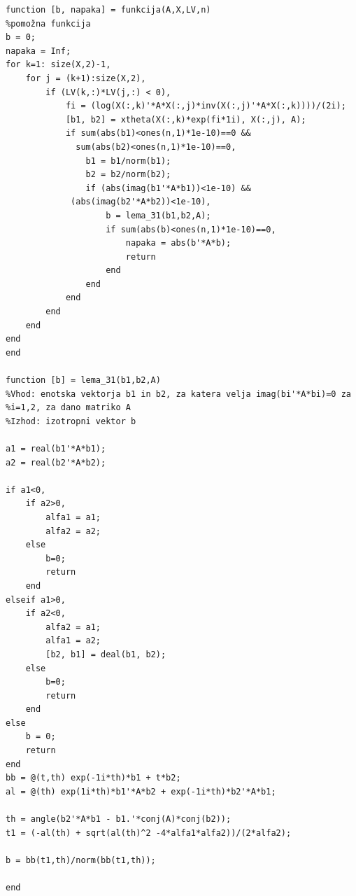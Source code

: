 \documentclass[12pt,a4paper]{amsart}
\theoremstyle{definition}
\theoremstyle{plain}
\begin{document}
\begin{verbatim}
function [b, napaka] = funkcija(A,X,LV,n)
%pomožna funkcija
b = 0;
napaka = Inf;
for k=1: size(X,2)-1,
    for j = (k+1):size(X,2),
        if (LV(k,:)*LV(j,:) < 0),
            fi = (log(X(:,k)'*A*X(:,j)*inv(X(:,j)'*A*X(:,k))))/(2i);
            [b1, b2] = xtheta(X(:,k)*exp(fi*1i), X(:,j), A);
            if sum(abs(b1)<ones(n,1)*1e-10)==0 && 
	          sum(abs(b2)<ones(n,1)*1e-10)==0,
                b1 = b1/norm(b1);
                b2 = b2/norm(b2);
                if (abs(imag(b1'*A*b1))<1e-10) && 
		     (abs(imag(b2'*A*b2))<1e-10),
                    b = lema_31(b1,b2,A);
                    if sum(abs(b)<ones(n,1)*1e-10)==0,
                        napaka = abs(b'*A*b);
                        return
                    end
                end
            end
        end
    end
end
end 

function [b] = lema_31(b1,b2,A)
%Vhod: enotska vektorja b1 in b2, za katera velja imag(bi'*A*bi)=0 za
%i=1,2, za dano matriko A
%Izhod: izotropni vektor b

a1 = real(b1'*A*b1);
a2 = real(b2'*A*b2);

if a1<0,
    if a2>0,
        alfa1 = a1;
        alfa2 = a2;
    else
        b=0;
        return
    end
elseif a1>0,
    if a2<0,
        alfa2 = a1;
        alfa1 = a2;
        [b2, b1] = deal(b1, b2);
    else
        b=0;
        return
    end
else
    b = 0;
    return
end
bb = @(t,th) exp(-1i*th)*b1 + t*b2;
al = @(th) exp(1i*th)*b1'*A*b2 + exp(-1i*th)*b2'*A*b1; 

th = angle(b2'*A*b1 - b1.'*conj(A)*conj(b2));
t1 = (-al(th) + sqrt(al(th)^2 -4*alfa1*alfa2))/(2*alfa2);

b = bb(t1,th)/norm(bb(t1,th));

end
\end{verbatim}
\end{document}
